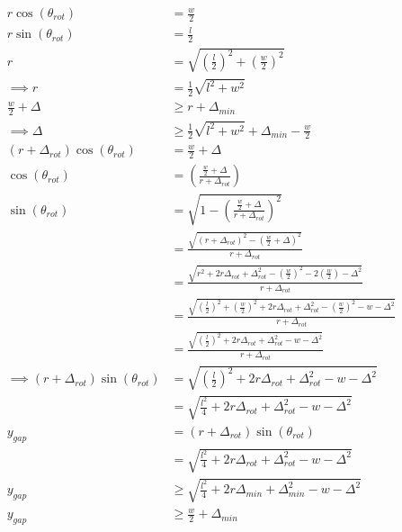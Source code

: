\documentclass{article}
\begin{document}
 	\begin{align}
 	r \cos \left({\theta_{rot}}\right) &= \frac{w}{2} \\
 	r \sin \left(\theta_{rot}\right) &= \frac{l}{2} \\
 	r &= \sqrt{\left(\frac{l}{2}\right)^{2} + \left(\frac{w}{2}\right)^{2}} \\
 	\implies r &= \frac{1}{2} \sqrt{l^{2} + w^{2}} \\
 	\frac{w}{2} + \Delta &\ge  r + \Delta_{min} \\
 	\implies \Delta &\ge \frac{1}{2} \sqrt{l^{2} + w^{2}} + \Delta_{min} - \frac{w}{2} \\
 	\left(r + \Delta_{rot}\right) \cos \left(\theta_{rot}\right) &= \frac{w}{2} + \Delta \\
 	\cos \left(\theta_{rot}\right) &= \left(\frac{\frac{w}{2} + \Delta}{r + \Delta_{rot}}\right) \\
 	\sin \left(\theta_{rot}\right) &= \sqrt{1 - \left(\frac{\frac{w}{2} + \Delta}{r + \Delta_{rot}}\right)^{2}} \\
 	&= \frac{\sqrt{\left(r + \Delta_{rot}\right)^{2} - \left(\frac{w}{2} + \Delta\right)^{2}}}{r + \Delta_{rot}} \\
 	&= \frac{\sqrt{r^{2} + 2 r \Delta_{rot} + \Delta_{rot}^{2} - \left(\frac{w}{2}\right)^{2} - 2 \left(\frac{w}{2}\right) - \Delta^{2}}}{r + \Delta_{rot}} \\
 	&= \frac{\sqrt{\left(\frac{l}{2}\right)^{2} + \left(\frac{w}{2}\right)^{2} + 2 r \Delta_{rot} + \Delta_{rot}^{2} - \left(\frac{w}{2}\right)^{2} - w - \Delta^{2}}}{r + \Delta_{rot}} \\
 	&= \frac{\sqrt{\left(\frac{l}{2}\right)^{2} + 2 r \Delta_{rot} + \Delta_{rot}^{2} - w - \Delta^{2}}}{r + \Delta_{rot}} \\
 	\implies \left(r + \Delta_{rot}\right) \sin \left(\theta_{rot}\right) &= \sqrt{\left(\frac{l}{2}\right)^{2} + 2 r \Delta_{rot} + \Delta_{rot}^{2} - w - \Delta^{2}} \\
 	&= \sqrt{\frac{l^{2}}{4} + 2 r \Delta_{rot} + \Delta_{rot}^{2} - w - \Delta^{2}} \\
 	y_{gap} &= \left(r + \Delta_{rot}\right) \sin \left(\theta_{rot}\right) \\
 	&= \sqrt{\frac{l^{2}}{4} + 2 r \Delta_{rot} + \Delta_{rot}^{2} - w - \Delta^{2}} \\
 	y_{gap} &\ge \sqrt{\frac{l^{2}}{4} + 2 r \Delta_{min} + \Delta_{min}^{2} - w - \Delta^{2}} \\
 	y_{gap} &\ge \frac{w}{2} + \Delta_{min}
 	\end{align}
 	
\end{document}
